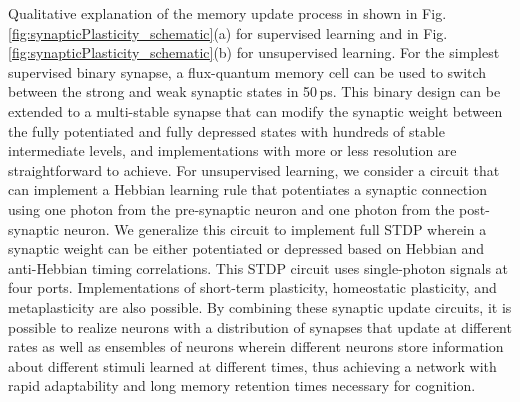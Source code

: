 \documentclass[twocolumn]{article}
\begin{document}
Qualitative explanation of the memory update process in shown in Fig.\,\ref{fig:synapticPlasticity_schematic}(a) for supervised learning and in Fig.\,\ref{fig:synapticPlasticity_schematic}(b) for unsupervised learning. For the simplest supervised binary synapse, a flux-quantum memory cell can be used to switch between the strong and weak synaptic states in 50\,ps. This binary design can be extended to a multi-stable synapse that can modify the synaptic weight between the fully potentiated and fully depressed states with hundreds of stable intermediate levels, and implementations with more or less resolution are straightforward to achieve. For unsupervised learning, we consider a circuit that can implement a Hebbian learning rule that potentiates a synaptic connection using one photon from the pre-synaptic neuron and one photon from the post-synaptic neuron. We generalize this circuit to implement full STDP wherein a synaptic weight can be either potentiated or depressed based on Hebbian and anti-Hebbian timing correlations. This STDP circuit uses single-photon signals at four ports. Implementations of short-term plasticity, homeostatic plasticity, and metaplasticity are also possible. By combining these synaptic update circuits, it is possible to realize neurons with a distribution of synapses that update at different rates as well as ensembles of neurons wherein different neurons store information about different stimuli learned at different times, thus achieving a network with rapid adaptability and long memory retention times necessary for cognition. 
	
\end{document}

